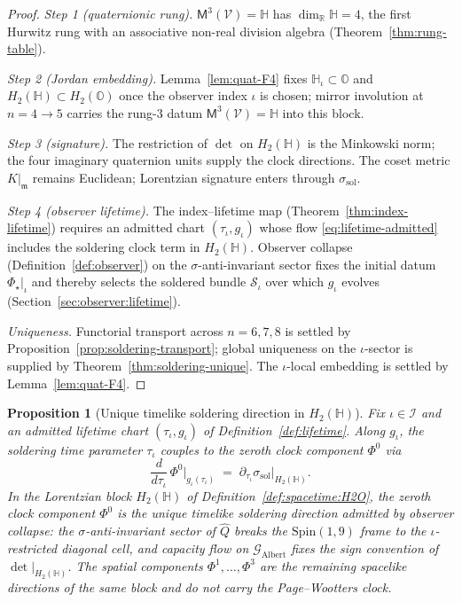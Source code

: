 \documentclass[11pt]{article}
\theoremstyle{plain}
\newtheorem{proposition}[theorem]{Proposition}
\theoremstyle{definition}
\theoremstyle{remark}
\numberwithin{equation}{section}
\newcommand{\R}{\mathbb{R}}
\newcommand{\Quat}{\mathbb{H}}
\newcommand{\Oct}{\mathbb{O}}
\newcommand{\Spin}{\mathrm{Spin}}
\newcommand{\Void}{\mathcal{V}}
\newcommand{\Mirror}{\mathsf{M}}
\newcommand{\orderparam}{\Phi}
\begin{document}
\begin{proof}
\emph{Step 1 (quaternionic rung).} $\Mirror^3(\Void)=\Quat$ has
$\dim_{\R}\Quat=4$, the first Hurwitz rung with an associative non-real
division algebra (Theorem~\ref{thm:rung-table}).

\emph{Step 2 (Jordan embedding).} Lemma~\ref{lem:quat-F4} fixes
$\Quat_\iota\subset\Oct$ and $H_2(\Quat)\subset H_2(\Oct)$ once the
observer index $\iota$ is chosen; mirror involution at $n=4\to5$ carries
the rung-$3$ datum $\Mirror^3(\Void)=\Quat$ into this block.

\emph{Step 3 (signature).} The restriction of $\det$ on $H_2(\Quat)$ is the
Minkowski norm; the four imaginary quaternion units supply the clock
directions. The coset metric $K|_{\mathfrak{m}}$ remains Euclidean;
Lorentzian signature enters through $\sigma_{\mathrm{sol}}$.

\emph{Step 4 (observer lifetime).} The index--lifetime map
(Theorem~\ref{thm:index-lifetime}) requires an admitted chart
$(\tau_\iota,g_\iota)$ whose flow \eqref{eq:lifetime-admitted} includes the
soldering clock term in $H_2(\Quat)$. Observer collapse
(Definition~\ref{def:observer}) on the $\sigma$-anti-invariant sector fixes
the initial datum $\orderparam_\star|_\iota$ and thereby selects the soldered
bundle $\mathcal{S}_\iota$ over which $g_\iota$ evolves
(Section~\ref{sec:observer:lifetime}).

\emph{Uniqueness.} Functorial transport across $n=6,7,8$ is settled by
Proposition~\ref{prop:soldering-transport}; global uniqueness on the
$\iota$-sector is supplied by Theorem~\ref{thm:soldering-unique}. The
$\iota$-local embedding is settled by Lemma~\ref{lem:quat-F4}.
\end{proof}

\begin{proposition}[Unique timelike soldering direction in $H_2(\Quat)$]
\label{prop:soldering-clock}
Fix $\iota\in\mathcal{I}$ and an admitted lifetime chart
$(\tau_\iota,g_\iota)$ of Definition~\ref{def:lifetime}. Along $g_\iota$,
the soldering time parameter $\tau_\iota$ couples to the zeroth clock
component $\orderparam^0$ via
\begin{equation}\label{eq:soldering-clock}
  \frac{d}{d\tau_\iota}\,\orderparam^0\big|_{g_\iota(\tau_\iota)}
  \;=\;
  \partial_{\tau_\iota}\sigma_{\mathrm{sol}}\big|_{H_2(\Quat)}.
\end{equation}
In the Lorentzian block $H_2(\Quat)$ of
Definition~\ref{def:spacetime:H2O}, the zeroth clock component
$\orderparam^0$ is the \emph{unique} timelike soldering direction admitted
by observer collapse: the $\sigma$-anti-invariant sector of $\hat Q$
breaks the $\Spin(1,9)$ frame to the $\iota$-restricted diagonal cell, and
capacity flow on $\mathcal{G}_{\mathrm{Albert}}$ fixes the sign convention
of $\det|_{H_2(\Quat)}$. The spatial components
$\orderparam^1,\ldots,\orderparam^3$ are the remaining spacelike directions
of the same block and do not carry the Page--Wootters clock.
\end{proposition}
\end{document}
